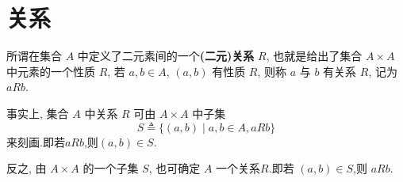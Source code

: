 \documentclass[../../main.tex]{subfiles}%
\begin{document}
\section{关系}

\begin{definition}[(二元)关系]
所谓在集合 \( A \) 中定义了二元素间的一个\textbf{(二元)关系} \( R \), 也就是给出了集合 \( A \times A \) 中元素的一个性质 \( R \), 若 \( a,b \in A \), \( (a,b) \) 有性质 \( R \), 则称 \( a \) 与 \( b \) 有关系 \( R \), 记为 \( aRb \).
\end{definition}
\begin{note}
事实上, 集合 \( A \) 中关系 \( R \) 可由 \( A \times A \) 中子集
\[
S \triangleq  \{(a,b) \mid a,b \in A, aRb\}
\]
来刻画.即若$aRb$,则$(a,b)\in S.$

反之, 由 \( A \times A \) 的一个子集 \( S \), 也可确定 \( A \) 一个关系$R$.即若 \( (a,b) \in S \),则 \( aRb \).
\end{note}
\end{document}

